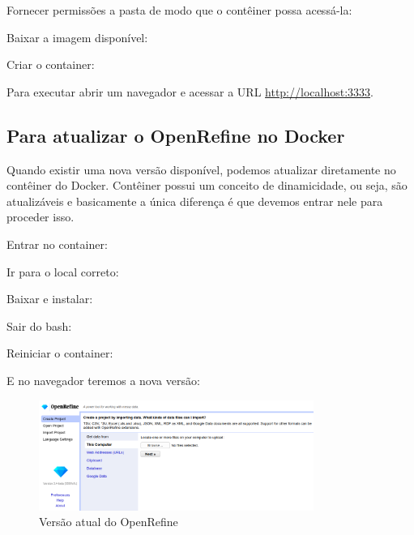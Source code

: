 \documentclass[a4paper,11pt]{article}
\begin{document}
Fornecer permissões a pasta de modo que o contêiner possa acessá-la: \\

Baixar a imagem disponível: \\

Criar o container: \\

Para executar abrir um navegador e acessar a URL \url{http://localhost:3333}.

\subsection{Para atualizar o OpenRefine no Docker}
Quando existir uma nova versão disponível, podemos atualizar diretamente no contêiner do Docker. Contêiner possui um conceito de dinamicidade, ou seja, são atualizáveis e basicamente a única diferença é que devemos entrar nele para proceder isso.

Entrar no container: \\

Ir para o local correto: \\

Baixar e instalar: \\

Sair do bash: \\

Reiniciar o container: \\

E no navegador teremos a nova versão:
\begin{figure}[H]
	\centering
	\includegraphics[width=0.8\textwidth]{imagem/novaVersao.png}
	\caption{Versão atual do OpenRefine}
\end{figure}
\end{document}
